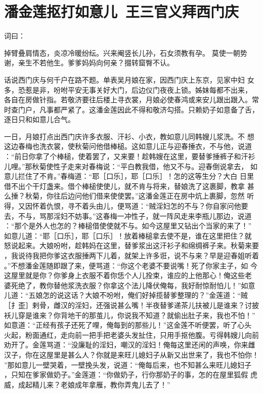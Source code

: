 \chapter{潘金莲抠打如意儿~王三官义拜西门庆}

词曰：

掉臂叠肩情态，炎凉冷暖纷纭。兴来阉竖长儿孙，石女须教有孕。
莫使一朝势谢，亲生不若他生。爹爹妈妈向何亲？掇转窟臀不认。

话说西门庆与何千户在路不题。单表吴月娘在家，因西门庆上东京，见家中妇
女多，恐惹是非，吩咐平安无事关好大门，后边仪门夜夜上锁。姊妹每都不出来，
各自在房做针指。若敬济要往后楼上寻衣裳，月娘必使春鸿或来安儿跟出跟入。常
时查门户，凡事都严紧了。这潘金莲因此不得和敬济勾搭。只赖奶子如意备了舌，
逐日只和如意儿合气。

一日，月娘打点出西门庆许多衣服、汗衫、小衣，教如意儿同韩嫂儿浆洗。不
想这边春梅也洗衣裳，使秋菊问他借棒槌。这如意儿正与迎春捶衣，不与他，说道
：“前日你拿了个棒槌，使着罢了，又来要！趁韩嫂在这里，要替爹捶裤子和汗衫
儿哩。”那秋菊使性子走来对春梅说：“平白教我借，他又不与。迎春倒说拿去，
如意儿拦住了不肯。”春梅道：“耶［口乐］，耶［口乐］！怎的这等生分？大白
日里借不出个干灯盏来。借个棒槌使使儿，就不肯与将来，替娘洗了这裹脚，教拿
甚么捶？秋菊，你往后边问他们借来使使罢。”这潘金莲正在房中炕上裹脚，忽然
听得，又因怀着仇恨，寻不着头由儿，便骂道：“贼淫妇怎的不与？你自家问他要
去，不与，骂那淫妇不妨事。”这春梅一冲性子，就一阵风走来李瓶儿那边，说道
：“那个是外人也怎的？棒槌借使使就不与。如今这屋里又钻出个当家的来了！”
如意儿道：“耶［口乐］，耶［口乐］！放着棒槌拿去使不是，谁在这里把住？就
怒说起来。大娘吩咐，趁韩妈在这里，替爹浆出这汗衫子和绵绸裤子来。秋菊来要
，我说待我把你爹这衣服捶两下儿着，就架上许多诳，说不与来？早是迎春姐听着
。”不想潘金莲随即跟了来，便骂道：“你这个老婆不要说嘴！死了你家主子，如
今这屋里就是你？你爹身上衣服不着你恁个人儿拴束，谁应的上他那心！俺这些老
婆死绝了，教你替他浆洗衣服？你拿这个法儿降伏俺每，我好耐惊耐怕儿！”如意
儿道：“五娘怎的说这话？大娘不吩咐，俺们好掉揽替爹整理的？”金莲道：“贼
［扌歪］剌骨，雌汉的淫妇，还强说甚么嘴！半夜替爹递茶儿扶被儿是谁来？讨披
袄儿穿是谁来？你背地干的那茧儿，你说我不知道？就偷出肚子来，我也不怕！”
如意道：“正经有孩子还死了哩，俺每到的那些儿！”这金莲不听便罢，听了心头
火起，粉面通红，走向前一把手把老婆头发扯住，只用手抠他腹。亏得韩嫂儿向前
劝开了。金莲骂道：“没廉耻的淫妇，嘲汉的淫妇！俺每这里还闲的声唤，你来雌
汉子，你在这屋里是甚么人？你就是来旺儿媳妇子从新又出世来了，我也不怕你！
”那如意儿一壁哭着，一壁挽头发，说道：“俺每后来，也不知甚么来旺儿媳妇子
，只知在爹家做奶子。”金莲道：“你做奶子，行你那奶子的事，怎的在屋里狐假
虎威，成起精儿来？老娘成年拿雁，教你弄鬼儿去了！”

